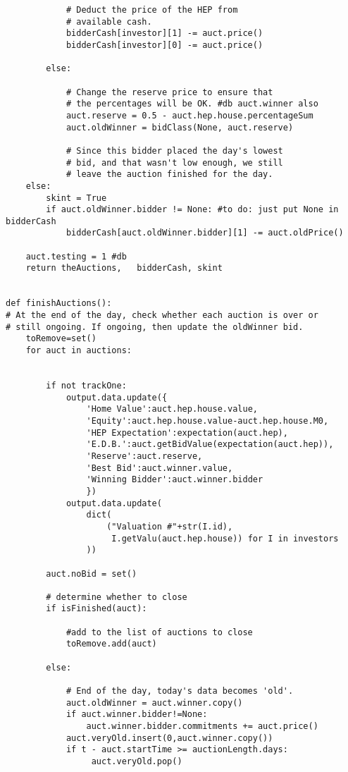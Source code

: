\begin{lstlisting}
            # Deduct the price of the HEP from
            # available cash.
            bidderCash[investor][1] -= auct.price()
            bidderCash[investor][0] -= auct.price()
            
        else:

            # Change the reserve price to ensure that
            # the percentages will be OK. #db auct.winner also
            auct.reserve = 0.5 - auct.hep.house.percentageSum
            auct.oldWinner = bidClass(None, auct.reserve)

            # Since this bidder placed the day's lowest
            # bid, and that wasn't low enough, we still
            # leave the auction finished for the day.
    else:
        skint = True
        if auct.oldWinner.bidder != None: #to do: just put None in bidderCash
            bidderCash[auct.oldWinner.bidder][1] -= auct.oldPrice()
            
    auct.testing = 1 #db
    return theAuctions,   bidderCash, skint


def finishAuctions():
# At the end of the day, check whether each auction is over or
# still ongoing. If ongoing, then update the oldWinner bid.
    toRemove=set()
    for auct in auctions:

    
        if not trackOne:
            output.data.update({
                'Home Value':auct.hep.house.value,
                'Equity':auct.hep.house.value-auct.hep.house.M0,
                'HEP Expectation':expectation(auct.hep),
                'E.D.B.':auct.getBidValue(expectation(auct.hep)),
                'Reserve':auct.reserve,
                'Best Bid':auct.winner.value,
                'Winning Bidder':auct.winner.bidder
                })
            output.data.update(
                dict(
                    ("Valuation #"+str(I.id),
                     I.getValu(auct.hep.house)) for I in investors
                ))     

        auct.noBid = set()

        # determine whether to close
        if isFinished(auct):

            #add to the list of auctions to close
            toRemove.add(auct)

        else:

            # End of the day, today's data becomes 'old'.
            auct.oldWinner = auct.winner.copy()
            if auct.winner.bidder!=None:
                auct.winner.bidder.commitments += auct.price()
            auct.veryOld.insert(0,auct.winner.copy())
            if t - auct.startTime >= auctionLength.days:
                 auct.veryOld.pop()


\end{lstlisting}
